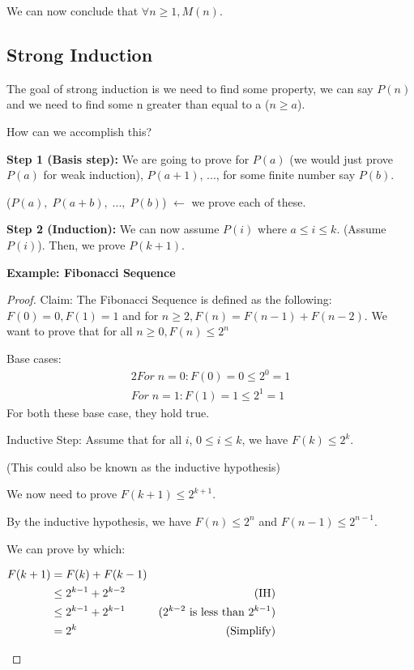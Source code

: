 \documentclass{article}
\begin{document}
We can now conclude that $ \forall n \ge 1, M(n) $.

\subsection {Strong Induction}
The goal of strong induction is we need to find some property, we can say $ P(n) $ and 
we need to find some n greater than equal to a ($ n \ge a $).

How can we accomplish this?

\textbf {Step 1 (Basis step):} We are going to prove for $ P(a) $ (we would just prove $ P(a) $ for weak induction), $ P(a + 1) $, ...,
for some finite number say $ P(b) $. 

($P(a),\; P(a + b),\;...,\;P(b)$) $ \leftarrow $ we prove each of these.

\textbf {Step 2 (Induction):} We can now assume $ P(i) $ where $ a \le i \le k $. (Assume $ P(i) $).
Then, we prove $ P(k + 1) $.

\textbf {Example: Fibonacci Sequence}
\begin{proof}
Claim: The Fibonacci Sequence is defined as the following: $ F(0) = 0, F(1) = 1 $ and for $ n \ge 2, F(n) = F(n - 1) + F(n - 2). $
We want to prove that for all $ n \ge 0 , F(n) \le 2^n $

Base cases:
\begin{alignat*}{2}
For\; n = 0: F(0) = 0 \le 2^0 = 1
\\
For\; n = 1: F(1) = 1 \le 2^1 = 1
\end{alignat*}
For both these base case, they hold true. 

Inductive Step: 
Assume that for all $ i $, $ 0 \le i \le k $, we have $ F(k) \le 2 ^ k $.

(This could also be known as the inductive hypothesis)

We now need to prove $ F(k + 1) \le 2 ^ {k + 1} $.

By the inductive hypothesis, we have $ F(n) \le 2^n $ and $ F(n - 1) \le 2^{n-1} $.

We can prove by which:
\begin{center}
  $\begin{aligned}
    F(k+1) & = F(k) + F(k-1)
    \\
    & \le 2^{k-1} + 2^{k-2} & \text{(IH)}
    \\
    & \le 2^{k-1} + 2^{k-1} & \text{($ 2^{k-2} $ is less than $ 2^{k-1} $)}
    \\
    & = 2^k & \text{(Simplify)} 
  \end{aligned}$
\end{center}
\end{proof}
\end{document}
